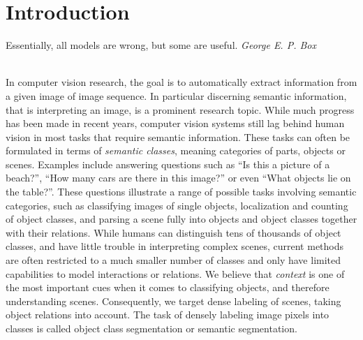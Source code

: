\chapter{Introduction}
\vspace{1cm}
\hfill%
\begin{minipage}{.4\linewidth}
Essentially, all models are wrong, but some are useful. 
\flushright%
\emph{George E. P. Box}

\end{minipage}%
\\[2cm]
In computer vision research, the goal is to automatically extract information
from a given image of image sequence.  In particular discerning semantic
information, that is interpreting an image, is a prominent research topic.
While much progress has been made in recent years, computer vision systems still lag behind
human vision in most tasks that require semantic information. These tasks can often be formulated
in terms of \emph{semantic classes}, meaning categories of parts, objects or scenes.
Examples include answering questions such as ``Is this a picture of a beach?'', ``How many
cars are there in this image?'' or even ``What objects lie on the table?''.
These questions illustrate a range of possible tasks involving semantic categories,
such as classifying images of single objects, localization and counting of object classes,
and parsing a scene fully into objects and object classes together with their relations.
%
While humans can distinguish tens of thousands of object classes, and have
little trouble in interpreting complex scenes, current methods are often
restricted to a much smaller number of classes and only have limited
capabilities to model interactions or relations.  We believe that
\emph{context} is one of the most important cues when it comes to classifying
objects, and therefore understanding scenes. Consequently, we target dense
labeling of scenes, taking object relations into account.  The task of densely
labeling image pixels into classes is called object class segmentation or
semantic segmentation.
\pagebreak


